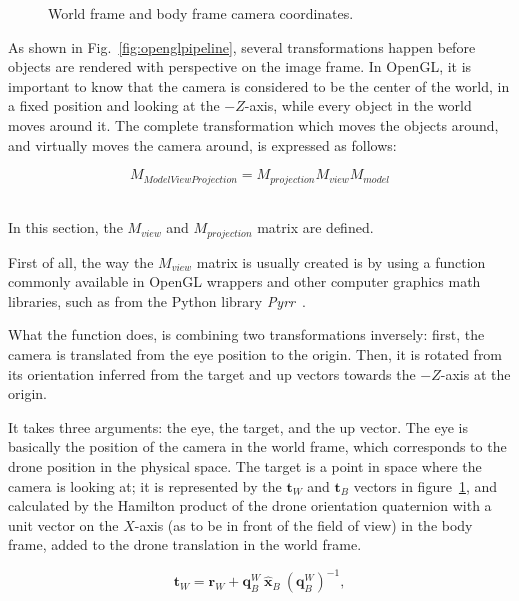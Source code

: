 \begin{figure}[h]
	\center
	\resizebox{240pt}{!}{
		
	}
	\caption{World frame and body frame camera coordinates.}
	\label{fig:coordinatesystem}
\end{figure}

As shown in Fig.~\ref{fig:openglpipeline}, several transformations happen
before objects are rendered with perspective on the image frame. In OpenGL, it
is important to know that the camera is considered to be the center of the
world, in a fixed position and looking at the $-Z$-axis, while every object in
the world moves around it. The complete transformation which moves the objects
around, and virtually moves the camera around, is expressed as follows:

\begin{equation} \label{equ:opengltransform}
	M_{ModelViewProjection} = M_{projection} M_{view} M_{model}
\end{equation}

~\\In this section, the $M_{view}$ and $M_{projection}$ matrix are defined.

First of all, the way the $M_{view}$ matrix is usually created is by using a
function commonly available in OpenGL wrappers and other computer graphics math
libraries, such as  from the Python library
\emph{Pyrr}~\cite{Pyrr}.

What the  function does, is combining two transformations
inversely: first, the camera is translated from the eye position to the origin.
Then, it is rotated from its orientation inferred from the target and up vectors
towards the $-Z$-axis at the origin.

It takes three arguments: the eye, the target, and the up vector. The eye is
basically the position of the camera in the world frame, which corresponds to
the drone position in the physical space. The target is a point in space where
the camera is looking at; it is represented by the $\mathbf{t}_W$ and
$\mathbf{t}_B$ vectors in figure~\ref{fig:coordinatesystem}, and calculated by the
Hamilton product of the drone orientation quaternion with a unit vector on the
$X$-axis (as to be in front of the field of view) in the body frame, added to
the drone translation in the world frame.

\begin{equation} \label{equ:targetvector}
	\mathbf{t}_W = \mathbf{r}_W + \mathbf{q}_B^W\:\mathbf{\hat{x}}_B\:
	(\mathbf{q}_{B}^{W})^{-1},
\end{equation}

